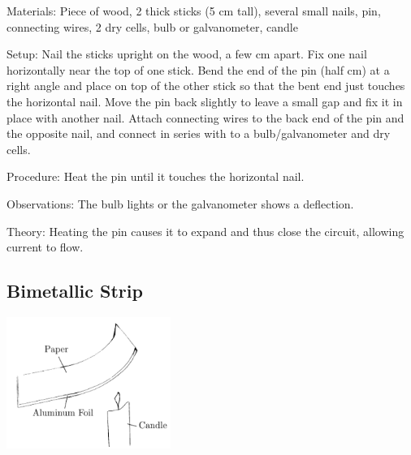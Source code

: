 \begin{multicols}{2}
\begin{description*}
\item[Materials:]{Piece of wood, 2 thick sticks (5 cm tall), several small nails, pin, connecting wires, 2 dry cells, bulb or galvanometer, candle}
\item[Setup:]{Nail the sticks upright on the wood, a few cm apart. Fix one nail horizontally near the top of one stick. Bend the end of the pin (half cm) at a right angle and place on top of the other stick so that the bent end just touches the horizontal nail. Move the pin back slightly to leave a small gap and fix it in place with another nail. Attach connecting wires to the back end of the pin and the opposite nail, and connect in series with to a bulb/galvanometer and dry cells.}
\item[Procedure:]{Heat the pin until it touches the horizontal nail.}
\item[Observations:]{The bulb lights or the galvanometer shows a deflection.}
\item[Theory:]{Heating the pin causes it to expand and thus close the circuit, allowing current to flow.}
\end{description*}

\subsection{Bimetallic Strip}

\begin{center}
\includegraphics[width=0.4\textwidth]{./img/bimetallic-strip.png}
\end{center}


\end{multicols}
